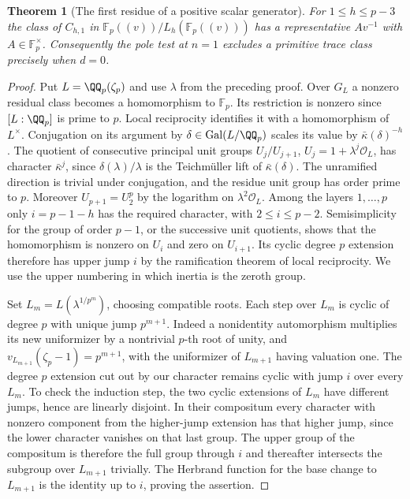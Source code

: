 \documentclass[a4paper,11pt]{article}
\newtheorem{theorem}[proposition]{Theorem}
\theoremstyle{definition}
\theoremstyle{remark}
\numberwithin{equation}{section}
\begin{document}
\begin{theorem}[The first residue of a positive scalar generator]
\leavevmode\label{thm:residuepositive749}
For \(1\le h\le p-3\) the class of \(C_{h,1}\) in
\(\mathbb F_p((v))/L_h(\mathbb F_p((v)))\) has a representative
\(A v^{-1}\) with \(A\in\mathbb F_p^\times\). Consequently the
pole test at \(n=1\) excludes a primitive trace class precisely
when \(d=0\).
\end{theorem}
\begin{proof}
Put \(L=\QQ_p(\zeta_p)\) and use \(\lambda\) from the preceding
proof. Over \(G_L\) a nonzero residual class becomes a homomorphism
to \(\mathbb F_p\). Its restriction is nonzero since \([L:\QQ_p]\)
is prime to \(p\). Local reciprocity identifies it with a homomorphism
of \(L^\times\). Conjugation on its argument by
\(\delta\in\operatorname{Gal}(L/\QQ_p)\) scales its value by
\(\bar\kappa(\delta)^{-h}\). The quotient of consecutive principal
unit groups \(U_j/U_{j+1}\), \(U_j=1+\lambda^j\mathcal O_L\),
has character \(\bar\kappa^j\), since
\(\delta(\lambda)/\lambda\) is the Teichm\"uller lift of
\(\bar\kappa(\delta)\). The unramified direction is trivial
under conjugation, and the residue unit group has order prime
to \(p\). Moreover \(U_{p+1}=U_2^p\) by the logarithm on
\(\lambda^2\mathcal O_L\). Among the layers \(1,\ldots,p\)
only \(i=p-1-h\) has the required character, with \(2\le i\le p-2\).
Semisimplicity for the group of order \(p-1\), or the successive
unit quotients, shows that the homomorphism is nonzero on \(U_i\)
and zero on \(U_{i+1}\). Its cyclic degree \(p\) extension
therefore has upper jump \(i\) by the ramification theorem of
local reciprocity. We use the upper numbering in which inertia
is the zeroth group.

Set \(L_m=L(\lambda^{1/p^m})\), choosing compatible roots.
Each step over \(L_m\) is cyclic of degree \(p\) with unique
jump \(p^{m+1}\). Indeed a nonidentity automorphism multiplies
its new uniformizer by a nontrivial \(p\)-th root of unity,
and \(v_{L_{m+1}}(\zeta_p-1)=p^{m+1}\), with the uniformizer
of \(L_{m+1}\) having valuation one. The degree \(p\) extension
cut out by our character remains cyclic with jump \(i\) over
every \(L_m\). To check the induction step, the two cyclic
extensions of \(L_m\) have different jumps, hence are linearly
disjoint. In their compositum every character with nonzero
component from the higher-jump extension has that higher jump,
since the lower character vanishes on that last group.
The upper group of the compositum is therefore the full group
through \(i\) and thereafter intersects the subgroup over
\(L_{m+1}\) trivially. The Herbrand function for the base change
to \(L_{m+1}\) is the identity up to \(i\), proving the assertion.


\end{proof}
\end{document}

